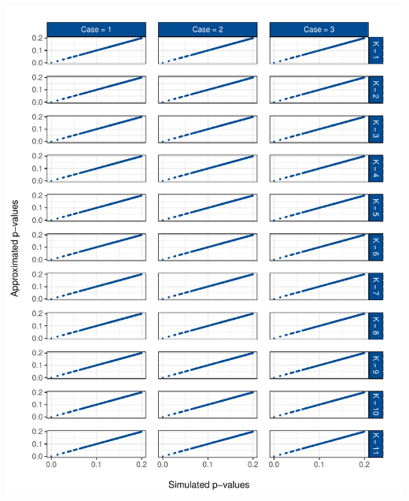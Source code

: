 \documentclass[12pt,a4paper]{article}
\let\origfigure\figure
\let\endorigfigure\endfigure
\renewenvironment{figure}[1][2] {
    \expandafter\origfigure\expandafter[H]
} {
    \endorigfigure
}
\begin{document}
\begin{figure}
\centering
\includegraphics{p_approx_paper_files/figure-latex/approx_sim-ej_0.2-1.pdf}
\caption{\label{fig:sim_approx_e_j_0.2} Simulated vs.~approximated
\(p\)-values for the lower tail of the distribution for all cases and EJ
test type.}
\end{figure}
\end{document}
